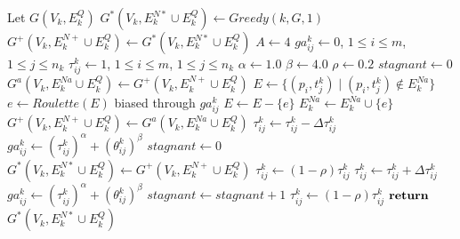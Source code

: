 \documentclass[preprint,authoryear]{elsarticle}
\begin{document}
\begin{algorithm}[H] 
	
	\caption{ $SolveNode(ACO, k, G)$ } \label{alg:aco}
	\begin{algorithmic}[1]
		\State Let $G(V_k, E^Q_k)$
		\State $G^*(V_k, E^{N*}_k \cup E^Q_k) \gets Greedy(k, G, 1)$  \label{aco:greedy}
		\State $G^+(V_k, E^{N+}_k \cup E^Q_k) \gets G^*(V_k,E^{N*}_k \cup E^Q_k)$
		\State $A \gets 4$ \label{aco:ants}
		\State $ga^k_{ij}   \gets 0$, $1 \leq i \leq m$, $1 \leq j \leq n_k$  \label{aco:init1}
		\State $\tau^k_{ij} \gets 1$, $1 \leq i \leq m$, $1 \leq j \leq n_k$   \label{aco:init2}
		\State $\alpha    \gets 1.0$ \label{aco:alpha}
		\State $\beta     \gets 4.0$ \label{aco:beta}
		\State $\rho      \gets 0.2$ \label{aco:rho}
		\State $stagnant \gets 0$
		 \label{aco:while}
			 \label{aco:g1}
				\State $G^a(V_k, E^{Na}_k \cup E^Q_k) \gets G^+(V_k, E^{N+}_k \cup E^Q_k)$
				\State $E \gets \{ (p_i,t^k_j) \mid (p_i,t^k_j) \not\in E^{Na}_k \}$
					\State $e \gets Roulette(E)$ biased through $ga^k_{ij}$  \label{aco:roulette}
					\State $E \gets E - \{e\}$		
						\State $ E^{Na}_k \gets E^{Na}_k \cup \{e\} $ \label{aco:ant2}
					\EndIf	
				\EndWhile	
				 \label{aco:gen1}
					\State $G^+(V_k, E^{N+}_k \cup E^Q_k) \gets G^a(V_k, E^{Na}_k \cup E^Q_k)$  \label{aco:gen2}
							\State $\tau^k_{ij} \gets \tau^k_{ij} - \Delta\tau^k_{ij}$ \label{aco:phero1}
							\State $ga^k_{ij} \gets (\tau^k_{ij})^\alpha + (\theta^k_{ij})^\beta$ \label{aco:ga1}
						\EndFor
				\EndIf 
			\EndFor \label{aco:g2}
			 \label{aco:best1}
				\State $stagnant \gets 0$
				\State $G^*(V_k, E^{N*}_k \cup E^Q_k) \gets G^+(V_k, E^{N+}_k \cup E^Q_k)$
					\State $\tau^k_{ij} \gets (1-\rho)\tau^k_{ij}$ \label{aco:rho1}
					\State $\tau^k_{ij} \gets \tau^k_{ij} + \Delta\tau^k_{ij}$ \label{aco:phero2}
					\State $ga^k_{ij} \gets (\tau^k_{ij})^\alpha + (\theta^k_{ij})^\beta$ \label{aco:ga2}
				\EndFor			
			\Else
				\State $stagnant \gets stagnant + 1$ \label{aco:best2}
			\EndIf
				\State $\tau^k_{ij} \gets (1-\rho)\tau^k_{ij}$ \label{aco:rho2}
			\EndFor	
		\EndWhile	
		\State ${\bf return}$ $G^*(V_k, E^{N*}_k \cup E^Q_k)$		
	\end{algorithmic}
\end{algorithm}
	
\end{document}
